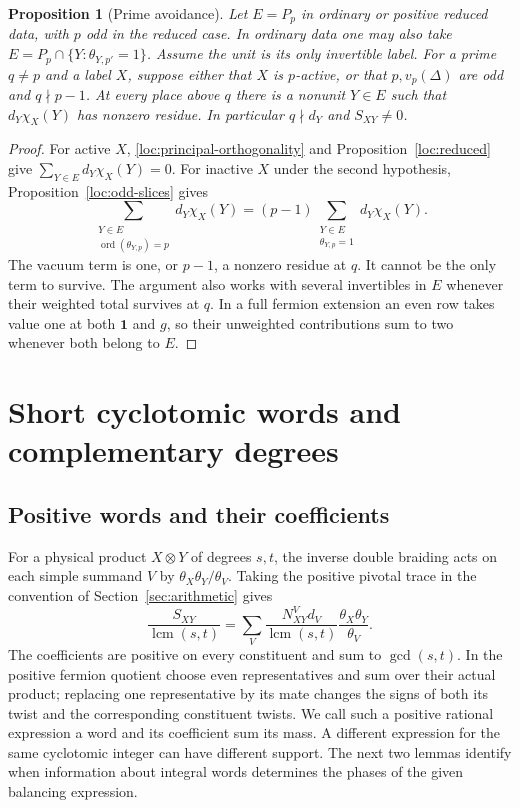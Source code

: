 \documentclass[11pt,a4paper]{article}
\numberwithin{equation}{section}
\newtheorem{proposition}[theorem]{Proposition}
\newcommand{\one}{\mathbf1}
\begin{document}
\begin{proposition}[Prime avoidance]\label{loc:prime-avoidance}
Let $E=P_p$ in ordinary or positive reduced data, with $p$ odd
in the reduced case. In ordinary data one may also take
$E=P_p\cap\{Y:\theta_{Y,p'}=1\}$. Assume the unit is its only
invertible label. For a prime $q\ne p$ and a label $X$, suppose
either that $X$ is $p$-active, or that $p,v_p(\Delta)$ are odd
and $q\nmid p-1$. At every place above $q$ there is a nonunit
$Y\in E$ such that $d_Y\chi_X(Y)$ has nonzero residue.
In particular $q\nmid d_Y$ and $S_{XY}\ne0$.
\end{proposition}
\begin{proof}
For active $X$, \eqref{loc:principal-orthogonality} and
Proposition~\ref{loc:reduced} give
$\sum_{Y\in E}d_Y\chi_X(Y)=0$. For inactive $X$ under the
second hypothesis, Proposition~\ref{loc:odd-slices} gives
\[
 \sum_{\substack{Y\in E\\\operatorname{ord}(\theta_{Y,p})=p}}
 d_Y\chi_X(Y)
 =(p-1)\sum_{\substack{Y\in E\\\theta_{Y,p}=1}}d_Y\chi_X(Y).
\]
The vacuum term is one, or $p-1$, a nonzero residue at $q$.
It cannot be the only term to survive. The argument also works with several invertibles in $E$ whenever
their weighted total survives at $q$. In a full fermion extension an
even row takes value one at both $\one$ and $g$, so their unweighted
contributions sum to two whenever both belong to $E$.
\end{proof}

\section{Short cyclotomic words and complementary degrees}\label{sec:crossings}

\subsection{Positive words and their coefficients}\label{sec:words}

For a physical product $X\otimes Y$ of degrees $s,t$, the inverse
double braiding acts on each simple summand $V$ by
$\theta_X\theta_Y/\theta_V$. Taking the positive pivotal trace in
the convention of Section~\ref{sec:arithmetic} gives
\begin{equation}\label{word:balancing}
 \frac{S_{XY}}{\operatorname{lcm}(s,t)}
 =\sum_V\frac{N_{XY}^Vd_V}{\operatorname{lcm}(s,t)}
                     \frac{\theta_X\theta_Y}{\theta_V}.
\end{equation}
The coefficients are positive on every constituent and sum to
$\gcd(s,t)$. In the positive fermion quotient choose even representatives and sum
over their actual product; replacing one representative by its mate
changes the signs of both its twist and the corresponding constituent
twists. We call such a positive rational expression a word and its
coefficient sum its mass. A different expression for the same
cyclotomic integer can have different support. The next two lemmas
identify when information about integral words determines the phases of
the given balancing expression.
\end{document}
